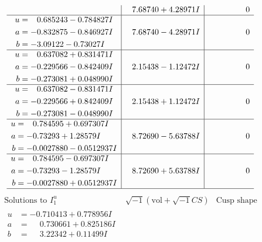 \documentclass[1p]{elsarticle_modified}
\theoremstyle{definition}
\newcommand{\I}{\sqrt{-1}}
\begin{document}
$$\begin{array}{c|c|c}
 & \phantom{-}7.68740 + 4.28971 I & \phantom{-0.000000 } 0 \\ \hline\begin{aligned}
u &= \phantom{-}0.685243 - 0.784827 I \\
a &= -0.832875 - 0.846927 I \\
b &= -3.09122 - 0.73027 I\end{aligned}
 & \phantom{-}7.68740 - 4.28971 I & \phantom{-0.000000 } 0 \\ \hline\begin{aligned}
u &= \phantom{-}0.637082 + 0.831471 I \\
a &= -0.229566 - 0.842409 I \\
b &= -0.273081 + 0.048990 I\end{aligned}
 & \phantom{-}2.15438 - 1.12472 I & \phantom{-0.000000 } 0 \\ \hline\begin{aligned}
u &= \phantom{-}0.637082 - 0.831471 I \\
a &= -0.229566 + 0.842409 I \\
b &= -0.273081 - 0.048990 I\end{aligned}
 & \phantom{-}2.15438 + 1.12472 I & \phantom{-0.000000 } 0 \\ \hline\begin{aligned}
u &= \phantom{-}0.784595 + 0.697307 I \\
a &= -0.73293 + 1.28579 I \\
b &= -0.0027880 - 0.0512937 I\end{aligned}
 & \phantom{-}8.72690 - 5.63788 I & \phantom{-0.000000 } 0 \\ \hline\begin{aligned}
u &= \phantom{-}0.784595 - 0.697307 I \\
a &= -0.73293 - 1.28579 I \\
b &= -0.0027880 + 0.0512937 I\end{aligned}
 & \phantom{-}8.72690 + 5.63788 I & \phantom{-0.000000 } 0\\
 \hline 
 \end{array}$$\newpage$$\begin{array}{c|c|c}  
\text{Solutions to }I^u_{1}& \I (\text{vol} + \sqrt{-1}CS) & \text{Cusp shape}\\
 \hline 
\begin{aligned}
u &= -0.710413 + 0.778956 I \\
a &= \phantom{-}0.730661 + 0.825186 I \\
b &= \phantom{-}3.22342 + 0.11499 I\end{aligned}

\end{array}$$
\end{document}
